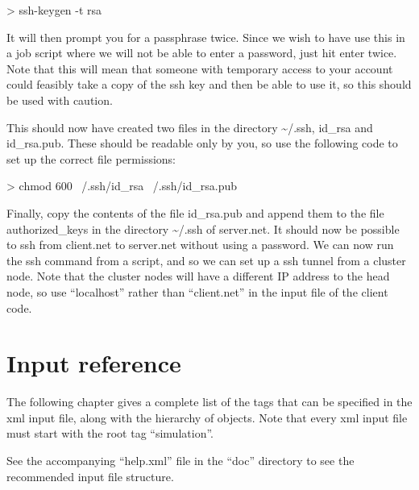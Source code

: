 \documentclass[11pt,english,fleqn]{report}
\newenvironment{code}{%
\footnotesize 
\verbatim
}{
\endverbatim
\normalsize
}
\begin{document}
\begin{code}
> ssh-keygen -t rsa
\end{code}

It will then prompt you for a passphrase twice. Since we wish to have
use this in a job script where we will not be able to enter a password,
just hit enter twice. Note that this will mean that someone with temporary
access to your account could feasibly take a copy of the ssh key and
then be able to use it, so this should be used with caution.

This should now have created two files in the directory \textasciitilde{}/.ssh,
id\_rsa and id\_rsa.pub. These should be readable only by you, so
use the following code to set up the correct file permissions:

\begin{code}
> chmod 600 ~/.ssh/id_rsa ~/.ssh/id_rsa.pub
\end{code}

Finally, copy the contents of the file id\_rsa.pub and append them
to the file authorized\_keys in the directory \textasciitilde{}/.ssh
of server.net. It should now be possible to ssh from client.net to
server.net without using a password. We can now run the ssh command
from a script, and so we can set up a ssh tunnel from a cluster node.
Note that the cluster nodes will have a different IP address to the
head node, so use {}``localhost'' rather than {}``client.net''
in the input file of the client code.


\chapter{Input reference}

\label{hierarchy}

The following chapter gives a complete list of the tags that can be
specified in the xml input file, along with the hierarchy of objects.
Note that every xml input file must start with the root tag {}``simulation''. 

See the accompanying {}``help.xml'' file in the {}``doc'' directory
to see the recommended input file structure.

























\end{document}
